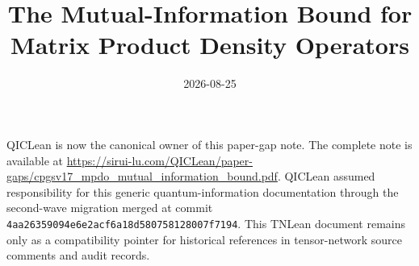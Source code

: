 \documentclass{article}
\title{The Mutual-Information Bound for Matrix Product Density Operators}
\author{}
\date{2026-08-25}
\begin{document}
\maketitle
{}

QICLean is now the canonical owner of this paper-gap note. The complete note is
available at
\url{https://sirui-lu.com/QICLean/paper-gaps/cpgsv17_mpdo_mutual_information_bound.pdf}.
QICLean assumed responsibility for this generic quantum-information
documentation through the second-wave migration merged at commit
\texttt{4aa26359094e6e2acf6a18d580758128007f7194}. This TNLean document remains
only as a compatibility pointer for historical references in tensor-network
source comments and audit records.
\end{document}
